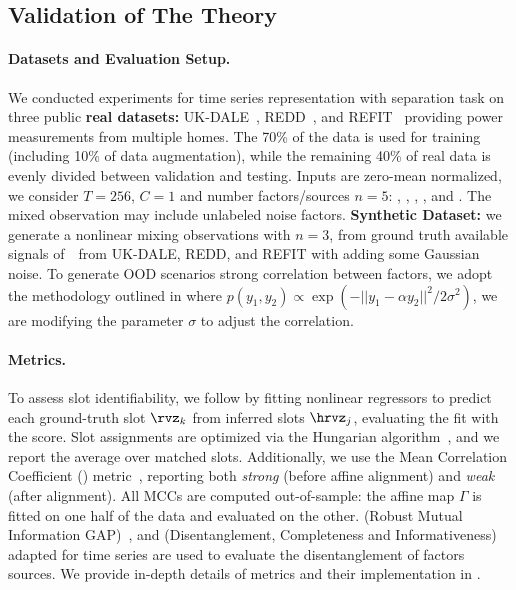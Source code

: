 \documentclass{article} %
\theoremstyle{plain}
\theoremstyle{definition}
\theoremstyle{remark}
\numberwithin{equation}{section}
\begin{document}
\subsection{Validation of The Theory}
\paragraph{Datasets and Evaluation Setup.}\label{subsec:datasets}
We conducted experiments for time series representation with separation task on three public \textbf{real datasets:} UK-DALE~\citep{kelly_uk-dale_2015}, REDD~\citep{kolter_redd_2011}, and REFIT~\citep{murray2017electrical} providing power measurements from multiple homes. The 70\% of the data is used for training (including 10\% of data augmentation), while the remaining 40\% of real data is evenly divided between validation and testing. Inputs are zero-mean normalized, we consider $T=256$, $C=1$ and number factors/sources $n=5$: , , , , and . The mixed observation may include unlabeled noise factors. \textbf{Synthetic Dataset:} we generate a nonlinear mixing observations with $n=3$, from ground truth available signals of~\SynFactors~from UK-DALE, REDD, and REFIT with adding some Gaussian noise. To generate OOD scenarios  \ie strong correlation between factors, we adopt the methodology outlined in \citep{trauble_disentangled_nodate} where $p(y_{1}, y_{2}) \propto \exp\left(-||y_{1} - \alpha y_{2}||^2/2\sigma^2\right)$, we are modifying the parameter $\sigma$ to adjust the correlation. \par
\vspace{-0.1cm}
\paragraph{Metrics.} To assess slot identifiability, we follow \citep{locatelloObjectCentricLearningSlot2020} by fitting nonlinear regressors to predict each ground-truth slot \(\rvz_k\) from inferred slots \(\hrvz_j\), evaluating the fit with the \RSquare score. Slot assignments are optimized via the Hungarian algorithm~\citep{kuhnHungarianMethodAssignment1955}, and we report the average \RSquare over matched slots. Additionally, we use the Mean Correlation Coefficient (\MCC) metric~\citep{iVAEkhemakhem20a}, reporting both \emph{strong} \MCC (before affine alignment) and \emph{weak} \MCC (after alignment). All MCCs are computed out-of-sample: the affine map \(\Gamma\) is fitted on one half of the data and evaluated on the other. \RMIG (Robust Mutual Information GAP)~\citep{do_theory_2020}, and \DCI (Disentanglement, Completeness and Informativeness)~\citep{eastwood2018framework} adapted for time series are used to evaluate the disentanglement of factors \ie sources. We provide in-depth details of metrics and their implementation in .
\end{document}
